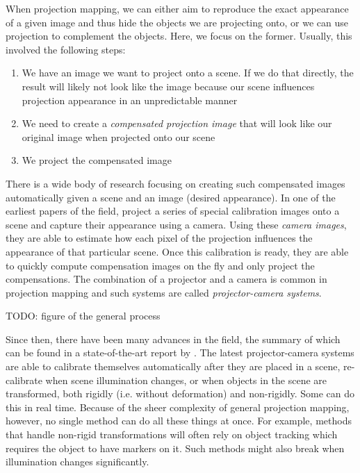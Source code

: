 When projection mapping, we can either aim to reproduce the exact appearance of a given image and thus hide the objects we are projecting onto, or we can use projection to complement the objects. Here, we focus on the former. Usually, this involved the following steps:

\begin{enumerate}
    \item We have an image we want to project onto a scene. If we do that directly, the result will likely not look like the image because our scene influences projection appearance in an unpredictable manner
    \item We need to create a \textit{compensated projection image} that will look like our original image when projected onto our scene
    \item We project the compensated image
\end{enumerate}

There is a wide body of research focusing on creating such compensated images automatically given a scene and an image (desired appearance). In one of the earliest papers of the field, \citet*{Grossberg2004} project a series of special calibration images onto a scene and capture their appearance using a camera. Using these \textit{camera images}, they are able to estimate how each pixel of the projection influences the appearance of that particular scene. Once this calibration is ready, they are able to quickly compute compensation images on the fly and only project the compensations. The combination of a projector and a camera is common in projection mapping and such systems are called \textit{projector-camera systems}.

{\color{red} TODO: figure of the general process}

Since then, there have been many advances in the field, the summary of which can be found in a state-of-the-art report by \citet*{Grundhofer2018}. The latest projector-camera systems are able to calibrate themselves automatically after they are placed in a scene, re-calibrate when scene illumination changes, or when objects in the scene are transformed, both rigidly (i.e. without deformation) and non-rigidly. Some can do this in real time. Because of the sheer complexity of general projection mapping, however, no single method can do all these things at once. For example, methods that handle non-rigid transformations will often rely on object tracking which requires the object to have markers on it. Such methods might also break when illumination changes significantly.

